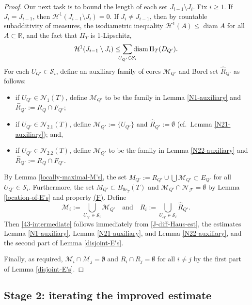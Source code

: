 \documentclass[12pt]{amsart}
\numberwithin{equation}{section}
\theoremstyle{plain}
\theoremstyle{definition}
\def\RR{\mathbb{R}}
\newcommand{\diam}{\mathop\mathrm{diam}\nolimits}
\newcommand{\Haus}{\mathcal{H}}
\numberwithin{figure}{section}
\begin{document}
\begin{proof}
Our next task is to bound the length of each set $J_{i-1}\setminus J_{i}$. Fix $i\geq 1$. If $J_{i}=J_{i-1}$, then $\Haus^1(J_{i-1}\setminus J_i)=0$. If $J_{i}\neq J_{i-1}$, then by countable subadditivity of measures, the isodiametric inequality $\Haus^1(A)\leq \diam A$ for all $A\subset \RR$, and the fact that $\Pi_T$ is 1-Lipschitz, \begin{equation}\label{J-diff-Haus-est}
\Haus^1(J_{i-1}\setminus J_{i}) \leq
   \sum_{\mathclap{U_{Q'}\in \mathcal{S}_i}} \diam \Pi_T(D_{Q'}).
\end{equation}
For each $U_{Q'}\in\mathcal{S}_i$, define an auxiliary family of cores $\mathcal{M}_{Q'}$ and Borel set $\hat R_{Q'}$ as follows: \begin{itemize}
\item if $U_{Q'}\in\mathcal{N}_1(T)$, define $\mathcal{M}_{Q'}$ to be the family in Lemma \ref{N1-auxiliary} and $\hat R_{Q'}:=R_Q\cap F_{Q'}$;
\item if $U_{Q'}\in\mathcal{N}_{2.1}(T)$, define $\mathcal{M}_{Q'}:=\{U_{Q'}\}$  and $\hat R_{Q'}:=\emptyset$ (cf.~Lemma \ref{N21-auxiliary}); and,
\item if $U_{Q'}\in\mathcal{N}_{2.2}(T)$, define $\mathcal{M}_{Q'}$ to be the family in Lemma \ref{N22-auxiliary} and $\hat R_{Q'}:=R_Q\cap F_{Q'}$.\end{itemize}
By Lemma \ref{locally-maximal-M's}, the set $M_{Q'}:=\hat R_{Q'}\cup\bigcup\mathcal{M}_{Q'}\subset E_{Q'}$ for all $U_{Q'}\in\mathcal{S}_i$. Furthermore, the set $M_{Q'}\subset B_{9r_T}(T)$ and $\mathcal{M}_{Q'}\cap\mathcal{N}_\mathcal{F}=\emptyset$ by Lemma \ref{location-of-E's} and property \hyperref[property-F]{(F)}. Define \begin{equation}
\mathcal{M}_i := \bigcup_{U_{Q'} \in \mathcal{S}_i} \mathcal{M}_{Q'}\quad\text{and}\quad R_i := \bigcup_{U_{Q'} \in \mathcal{S}_i} \hat R_{Q'}.\end{equation} Then \eqref{43-intermediate} follows immediately from \eqref{J-diff-Haus-est}, the estimates Lemma \ref{N1-auxiliary}, Lemma \ref{N21-auxiliary}, and Lemma \ref{N22-auxiliary}, and the second part of Lemma \ref{disjoint-E's}.

Finally, as required, $\mathcal{M}_i\cap\mathcal{M}_j=\emptyset$ and $R_i\cap R_j=\emptyset$ for all $i\neq j$ by the first part of Lemma \ref{disjoint-E's}.\end{proof}

\subsection{Stage 2: iterating the improved estimate}
\end{document}
